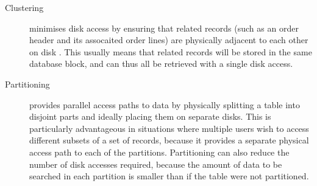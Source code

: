 \documentclass{llncs}
\begin{document}
\begin{description}


	\item[Clustering] minimises disk access by ensuring that related
	records (such as an order header and its assocaited order lines) are
	physically adjacent to each other on disk
	\cite{Chan-N-2003-clustering}. This usually means that related
	records will be stored in the same database block, and can thus all
	be retrieved with a single disk access.

% 


	\item[Partitioning] provides parallel access paths to data by
	physically splitting a table into disjoint parts and ideally placing
	them on separate disks. This is particularly advantageous in
	situations where multiple users wish to access different subsets of
	a set of records, because it provides a separate physical access
	path to each of the partitions. Partitioning can also reduce the
	number of disk accesses required, because the amount of data to be
	searched in each partition is smaller than if the table were not
	partitioned.


\end{description}
\end{document}
